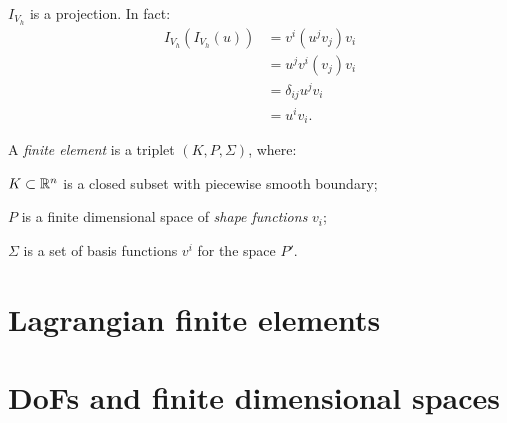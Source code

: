\begin{remark}
$I_{V_h}$ is a projection. In fact:
\begin{align}
I_{V_h}(I_{V_h}(u)) &= v^i (u^j  v_j) v_i \\
&= u^j v^i(v_j) v_i \\
&= \delta_{ij} u^j  v_i \\
&= u^i  v_i.
\end{align}
\end{remark}

\begin{definition}[Ciarlet, 1978] 
A \emph{finite element} is a triplet $(K,P,\Sigma)$, where:
\begin{romanlist}
\item $K\subset \mathbb{R}^n$ is a closed subset with piecewise smooth boundary;
\item $P$ is a finite dimensional space of \emph{shape functions} $v_i$;
\item $\Sigma$ is a set of basis functions $v^i$ for the space $P'$.
\end{romanlist}
\end{definition}


\section{Lagrangian finite elements}

\section{DoFs and finite dimensional spaces}
